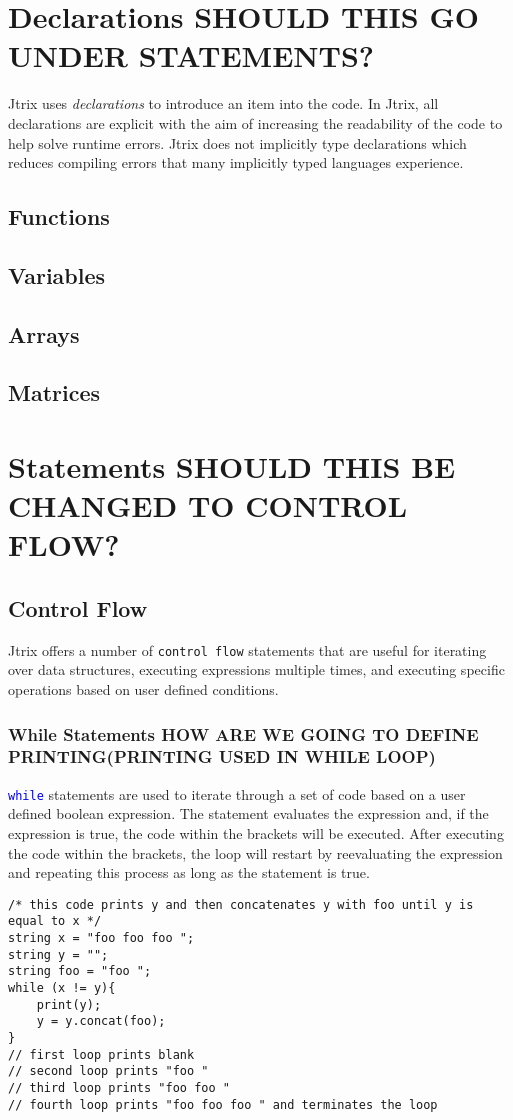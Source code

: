 \documentclass[12pt]{report}
\begin{document}
{\chapter{Declarations SHOULD THIS GO UNDER STATEMENTS?}
Jtrix uses \textit{declarations} to introduce an item into the code. In Jtrix, all declarations are explicit with the aim of increasing the readability of the code to help solve runtime errors. Jtrix does not implicitly type declarations which reduces compiling errors that many implicitly typed languages experience.
\section{Functions}
\section{Variables}
\section{Arrays}
\section{Matrices}

\chapter{Statements SHOULD THIS BE CHANGED TO CONTROL FLOW?}
\section{Control Flow}
Jtrix offers a number of \texttt{control flow} statements that are useful for iterating over data structures, executing expressions multiple times, and executing specific operations based on user defined conditions. 
\subsection{While Statements HOW ARE WE GOING TO DEFINE PRINTING(PRINTING USED IN WHILE LOOP)}
\textcolor{blue}{\texttt{while}} statements are used to iterate through a set of code based on a user defined boolean expression. The statement evaluates the expression and, if the expression is true, the code within the brackets will be executed.  After executing the code within the brackets, the loop will restart by reevaluating the expression and repeating this process as long as the statement is true.
\begin{lstlisting}
/* this code prints y and then concatenates y with foo until y is equal to x */
string x = "foo foo foo ";
string y = "";
string foo = "foo ";
while (x != y){ 
	print(y);
	y = y.concat(foo);
}
// first loop prints blank
// second loop prints "foo "
// third loop prints "foo foo "
// fourth loop prints "foo foo foo " and terminates the loop
\end{lstlisting}

}
\end{document}

